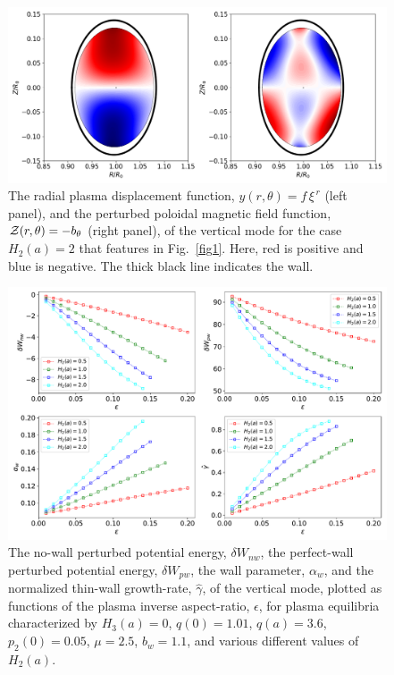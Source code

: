 \documentclass[12pt,prb,aps]{revtex4-1}
\begin{document}
\newpage
\begin{figure}
\centerline{\includegraphics[width=\textwidth]{Fig2.png}}
\caption{The radial plasma displacement function, $y(r,\theta)=f\,\xi^{\,r}$ (left panel), and the perturbed poloidal magnetic
field function, ${\cal Z}(r,\theta)= - b_\theta$ (right panel), of the vertical  mode  for the case $H_2(a)=2$ that features in Fig.~\ref{fig1}.
Here, red is positive and blue is negative. The thick black line indicates the wall. \label{fig2}}
\end{figure}

\begin{figure}
\centerline{\includegraphics[width=\textwidth]{Fig3.pdf}}
\caption{The no-wall perturbed potential energy, $\delta W_{nw}$, the perfect-wall perturbed potential energy, $\delta W_{pw}$, the wall
parameter, $\alpha_w$, and the normalized thin-wall growth-rate, $\hat{\gamma}$,  of the  vertical mode, plotted as  functions of the
plasma  inverse aspect-ratio, $\epsilon$, for plasma equilibria characterized by   $H_3(a)=0$, $q(0)=1.01$, $q(a)=3.6$,  $p_2(0)=0.05$, $\mu=2.5$, $b_w=1.1$, and
various different values of $H_2(a)$.  \label{fig3}}
\end{figure}
\end{document}
